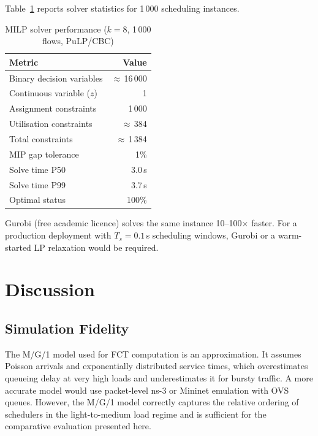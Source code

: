 \documentclass[runningheads]{llncs}
\begin{document}
Table~\ref{tab:milp} reports solver statistics for 1\,000 scheduling instances.

\begin{table}[t]
\centering
\caption{MILP solver performance ($k{=}8$, 1\,000 flows, PuLP/CBC)}
\label{tab:milp}
\begin{tabular}{lr}
\toprule
Metric & Value \\
\midrule
Binary decision variables & $\approx$\,16\,000 \\
Continuous variable ($z$) & 1 \\
Assignment constraints & 1\,000 \\
Utilisation constraints & $\approx$\,384 \\
Total constraints & $\approx$\,1\,384 \\
MIP gap tolerance & 1\% \\
Solve time P50 & 3.0\,s \\
Solve time P99 & 3.7\,s \\
Optimal status & 100\% \\
\bottomrule
\end{tabular}
\end{table}

Gurobi (free academic licence) solves the same instance 10--100$\times$ faster. For a production deployment with $T_s = 0.1$\,s scheduling windows, Gurobi or a warm-started LP relaxation would be required.

\section{Discussion}
\label{sec:discussion}

\subsection{Simulation Fidelity}

The M/G/1 model used for FCT computation is an approximation. It assumes Poisson arrivals and exponentially distributed service times, which overestimates queueing delay at very high loads and underestimates it for bursty traffic. A more accurate model would use packet-level ns-3 or Mininet emulation with OVS queues. However, the M/G/1 model correctly captures the relative ordering of schedulers in the light-to-medium load regime and is sufficient for the comparative evaluation presented here.
\end{document}
